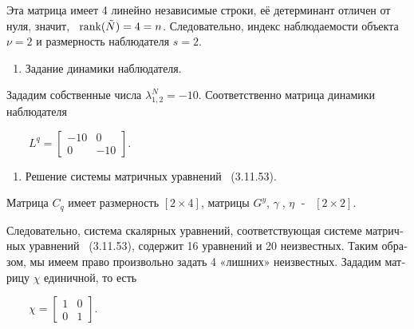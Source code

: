 \documentclass[a4paper]{article}
\newcounter{saveenum}
\newcommand\liststyleWWviiiNumxxxviii{%
\renewcommand\theenumi{\arabic{enumi}}
\renewcommand\theenumii{\alph{enumii}}
\renewcommand\theenumiii{\roman{enumiii}}
\renewcommand\theenumiv{\arabic{enumiv}}
\renewcommand\labelenumi{\theenumi.}
\renewcommand\labelenumii{\theenumii.}
\renewcommand\labelenumiii{\theenumiii.}
\renewcommand\labelenumiv{\theenumiv.}
}
\newcommand\normalsubformula[1]{\text{\mathversion{normal}$#1$}}
\begin{document}
{\begin{russian}\sffamily
Эта матрица имеет 4 линейно независимые строки, её детерминант отличен от нуля, значит, \ 
$\normalsubformula{\text{rank}}(\tilde  N)=4=n$. Следовательно, индекс наблюдаемости объекта  $ν=2$ и размерность
наблюдателя  $s=2$.
\end{russian}}

\liststyleWWviiiNumxxxviii
\begin{enumerate}
\item {\begin{russian}\sffamily
Задание динамики наблюдателя.
\end{russian}}
\end{enumerate}
{\begin{russian}\sffamily
Зададим собственные числа  $λ_{1,2}^N=-10$. Соответственно матрица динамики наблюдателя
\end{russian}}

{\begin{russian}\sffamily
\ \ \ \   $L^q=\left[\begin{matrix}-10&0\\0&-10\end{matrix}\right]$.
\end{russian}}

\liststyleWWviiiNumxxxviii
\setcounter{saveenum}{\value{enumi}}
\begin{enumerate}
\setcounter{enumi}{\value{saveenum}}
\item {\begin{russian}\sffamily
Решение системы матричных уравнений \ (3.11.53).
\end{russian}}
\end{enumerate}
{\begin{russian}\sffamily
Матрица  $C_q$ имеет размерность  $[2\times 4]$, матрицы  $G^y$,  $γ\;$,  $η\;$ - \  $[2\times 2]$.
\end{russian}}

{\begin{russian}\sffamily
Следовательно, система скалярных уравнений, соответствующая системе матричных уравнений \ (3.11.53), содержит 16
уравнений и 20 неизвестных. Таким образом, мы имеем право произвольно задать 4 «лишних» неизвестных. Зададим матрицу 
$χ$ единичной, то есть
\end{russian}}

{\begin{russian}\sffamily
\ \ \ \  $χ=\left[\begin{matrix}1&0\\0&1\end{matrix}\right]$.
\end{russian}}
\end{document}
